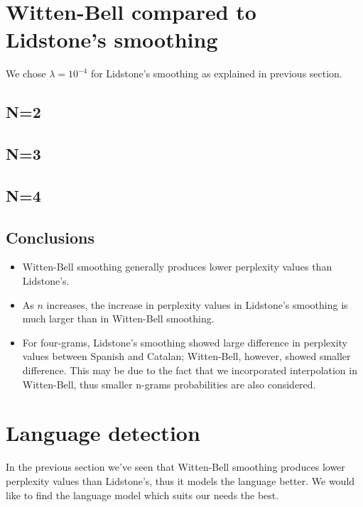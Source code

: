 \documentclass[paper=a4, fontsize=11pt]{scrartcl} %
\numberwithin{equation}{section} %
\numberwithin{figure}{section} %
\numberwithin{table}{section} %
\begin{document}
\newpage
\section{Witten-Bell compared to Lidstone's smoothing}

We chose $\lambda=10^{-4}$ for Lidstone's smoothing as explained in previous section.

\subsection*{N=2}



\newpage
\subsection*{N=3}



\newpage
\subsection*{N=4}



\subsection*{Conclusions}

\begin{itemize}
	\item Witten-Bell smoothing generally produces lower perplexity values than Lidstone's.
	\item As $n$ increases, the increase in perplexity values in Lidstone's smoothing is much larger than in Witten-Bell smoothing.
	\item For four-grams, Lidstone's smoothing showed large difference in perplexity values between Spanish and Catalan;
		Witten-Bell, however, showed smaller difference. This may be due to the fact that we incorporated interpolation in Witten-Bell, thus
		smaller n-grams probabilities are also considered.
\end{itemize}

\section{Language detection}

In the previous section we've seen that Witten-Bell smoothing produces lower perplexity values than Lidstone's,
thus it models the language better. We would like to find the language model which suits our needs the best.
\end{document}
